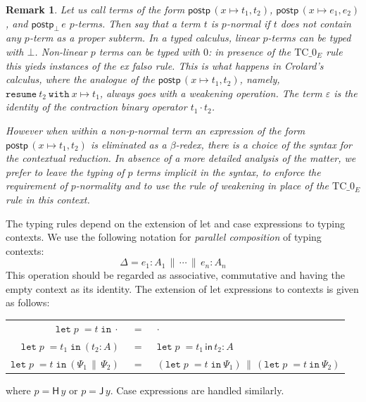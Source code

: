 \documentclass{lmcs}
\newtheorem{remark}[theorem]{Remark}
\newcommand{\DualLNLLogicnt}[1]{\mathit{#1}}
\newcommand{\DualLNLLogicmv}[1]{\mathit{#1}}
\newcommand{\DualLNLLogicdrulename}[1]{\textsc{#1}}
\newcommand{\DualLNLLogicdruleTCXXzIName}[0]{\DualLNLLogicdrulename{TC\_zI}}
\renewcommand{\DualLNLLogicdrulename}[1]{#1}
\renewcommand{\DualLNLLogicdruleTCXXzIName}{\text{TC\_}0_E}
\begin{document}
\begin{remark}
  Let us call terms of the form $ \mathsf{postp}\,( \DualLNLLogicmv{x}  \mapsto  \DualLNLLogicnt{t_{{\mathrm{1}}}} ,  \DualLNLLogicnt{t_{{\mathrm{2}}}} ) $, $ \mathsf{postp}\,( \DualLNLLogicmv{x}  \mapsto  \DualLNLLogicnt{e_{{\mathrm{1}}}} ,  \DualLNLLogicnt{e_{{\mathrm{2}}}} ) $, and $ \mathsf{postp}_\perp\, \DualLNLLogicnt{e} $ $p$-\emph{terms}. Then say that
  a term $t$ is \emph{$p$-normal} if $t$ does not contain any $p$-term
  as a proper subterm.  In a typed calculus, linear $p$-terms can be typed
  with $\bot$.  Non-linear $p$ terms can be typed with $0$:  in
  presence of the $\DualLNLLogicdruleTCXXzIName$ rule this yieds
instances of the \emph{ex falso} rule. This is what happens in Crolard's 
calculus, where the analogue of the $ \mathsf{postp}\,( \DualLNLLogicmv{x}  \mapsto  \DualLNLLogicnt{t_{{\mathrm{1}}}} ,  \DualLNLLogicnt{t_{{\mathrm{2}}}} ) $, namely, 
$\mathtt{resume}\ t_2\ \mathtt{with}\ x\mapsto t_1$, always goes with a 
\emph{weakening} operation. The term $ \varepsilon $ is the identity of the
contraction binary operator $ \DualLNLLogicnt{t_{{\mathrm{1}}}}  \cdot  \DualLNLLogicnt{t_{{\mathrm{2}}}} $.

\noindent
However when within a non-$p$-normal term an expression of the form 
$ \mathsf{postp}\,( \DualLNLLogicmv{x}  \mapsto  \DualLNLLogicnt{t_{{\mathrm{1}}}} ,  \DualLNLLogicnt{t_{{\mathrm{2}}}} ) $ is eliminated as a $\beta$-redex, there is a choice
of the syntax for the contextual reduction. In absence of a more detailed 
analysis of the matter, we prefer to leave the typing of $p$ terms implicit 
in the syntax, to enforce the requirement of $p$-normality and to use the 
rule of weakening in place of the  $\DualLNLLogicdruleTCXXzIName$ 
rule in this context. 
\end{remark}

The typing rules depend on the extension of let and case expressions
to typing contexts.  We use the following notation for \emph{parallel
  composition} of typing contexts:
\[
\Delta = e_1: A_1\,\|\, \cdots \,\|\, e_n: A_n\qquad 
\]
This operation should be regarded as associative, commutative and
having the empty context as its identity. 
The extension of let expressions to contexts is given as follows:
\begin{center}
  \begin{tabular}{rcl}
    $\mathtt{let}\; p\; = t\; \mathtt{in}\ \cdot$ &\ =\ & $\cdot$\\
    $\mathtt{let}\; p\; = \DualLNLLogicnt{t_{{\mathrm{1}}}}\; \mathtt{in}\ (\DualLNLLogicnt{t_{{\mathrm{2}}}}: A)$ &\ =\ & $\mathtt{let}\; p\; = \DualLNLLogicnt{t_{{\mathrm{1}}}}\,\mathsf{in}\,\DualLNLLogicnt{t_{{\mathrm{2}}}} : A$\\
    $\mathtt{let}\; p\; = t\; \mathtt{in}\ (\Psi_{{\mathrm{1}}}\,\|\,\Psi_{{\mathrm{2}}})$ &\ =\ & 
    $(\mathtt{let}\; p\; = t\; \mathtt{in}\ \Psi_{{\mathrm{1}}})\,\|\, (\mathtt{let}\; p\; = t\ \mathtt{in}\ \Psi_{{\mathrm{2}}})$
  \end{tabular}
\end{center}
where $p =  \mathsf{H}\, \DualLNLLogicmv{y} $ or $p =  \mathsf{J}\, \DualLNLLogicmv{y} $.
Case expressions are handled similarly.
\end{document}
